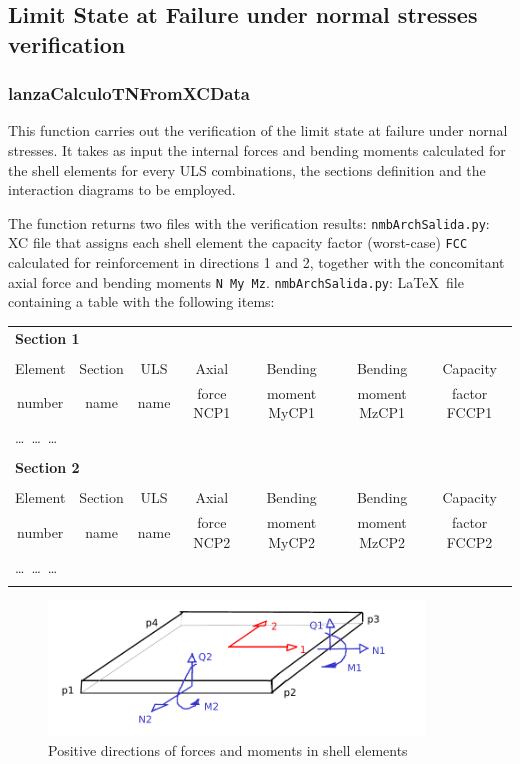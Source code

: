 \subsection{Limit State at Failure under normal stresses verification}

\subsubsection{lanzaCalculoTNFromXCData}
This function carries out the verification of the limit state at failure under nornal stresses. It takes as input the internal forces and bending moments calculated for the shell elements for every ULS combinations, the sections definition and the interaction diagrams to be employed.

The function returns two files with the verification results:
{\tt nmbArchSalida.py}: XC file that assigns each shell element the capacity factor (worst-case) {\tt FCC} calculated for reinforcement in directions 1 and 2, together with the concomitant axial force and bending moments {\tt N My Mz}.
{\tt nmbArchSalida.py}: \LaTeX\  file containing a table with the following items:

\begin{center}
\begin{tabular}{ccccccc}
\multicolumn{7}{l}{\textbf{Section 1}} \\
\\
Element & Section & ULS & Axial & Bending & Bending & Capacity \\
number  & name & name & force NCP1 & moment MyCP1 & moment MzCP1 & factor FCCP1 \\
\hline
\multicolumn{7}{l}{\ldots\ \ldots\ \ldots} \\
\\
\multicolumn{7}{l}{\textbf{Section 2}} \\
\\
Element & Section & ULS & Axial & Bending & Bending & Capacity \\
number  & name & name & force NCP2 & moment MyCP2 & moment MzCP2 & factor FCCP2 \\
\hline
\multicolumn{7}{l}{\ldots\ \ldots\ \ldots} \\
\\

\end{tabular}
\end{center}

\begin{figure}[h]
\centering
\includegraphics[width=100mm]{materials/figures/signosEsfuerzos}
\caption{Positive directions of forces and moments in shell elements}\label{shell_forces_moments}
\end{figure}

